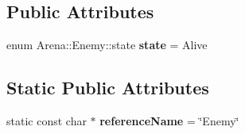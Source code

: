 \subsection*{Public Attributes}
\begin{DoxyCompactItemize}
\item 
\hypertarget{class_arena_1_1_enemy_a33ff6676f2db2d1a7ca544efae35ba89}{enum Arena\+::\+Enemy\+::state {\bfseries state} = Alive}\label{class_arena_1_1_enemy_a33ff6676f2db2d1a7ca544efae35ba89}

\end{DoxyCompactItemize}
\subsection*{Static Public Attributes}
\begin{DoxyCompactItemize}
\item 
\hypertarget{class_arena_1_1_enemy_a6d24e2b081471cdf2f98b2be7efa4f69}{static const char $\ast$ {\bfseries reference\+Name} = \char`\"{}Enemy\char`\"{}}\label{class_arena_1_1_enemy_a6d24e2b081471cdf2f98b2be7efa4f69}

\end{DoxyCompactItemize}

